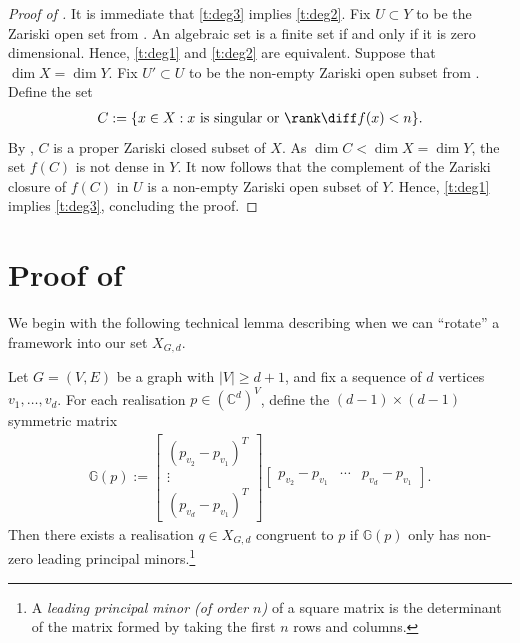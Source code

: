 \begin{proof}[Proof of ]
	It is immediate that \ref{t:deg3} implies \ref{t:deg2}.
	Fix $U \subset Y$ to be the Zariski open set from .
	An algebraic set is a finite set if and only if it is zero dimensional.
	Hence, \ref{t:deg1} and \ref{t:deg2} are equivalent.
	Suppose that $\dim X=\dim Y$.
	Fix $U' \subset U$ to be the non-empty Zariski open subset from .
	Define the set
	\begin{align*}
		C := \{x \in X : x \text{ is singular or } \rank \diff f(x) <n\}.
	\end{align*}
	By ,
	$C$ is a proper Zariski closed subset of $X$.
	As $\dim C < \dim X = \dim Y$,
	the set $f(C)$ is not dense in $Y$.
	It now follows that the complement of the Zariski closure of $f(C)$ in $U$ is a non-empty Zariski open subset of $Y$.
	Hence, \ref{t:deg1} implies \ref{t:deg3},
	concluding the proof.
\end{proof}







\section{Proof of \texorpdfstring{}{Lemma}}
\label{sec:xgd}

We begin with the following technical lemma describing when we can ``rotate'' a framework into our set $X_{G,d}$.

\begin{lemma}\label{l:rotate}
	Let $G=(V,E)$ be a graph with $|V| \geq d+1$,
	and fix a sequence of $d$ vertices $v_1,\ldots, v_d$.
	For each realisation $p \in (\mathbb{C}^d)^V$,
	define the $(d-1) \times (d-1)$ symmetric matrix
	\begin{align*}
		\mathbb{G}(p) := 		
		\begin{bmatrix}
			(p_{v_2} - p_{v_1})^T \\
			\vdots \\
			(p_{v_d} - p_{v_1})^T
		\end{bmatrix}
		\begin{bmatrix}
			p_{v_2} - p_{v_1} & \cdots & p_{v_d} - p_{v_1}
		\end{bmatrix}.
	\end{align*}
	Then there exists a realisation $q \in X_{G,d}$ congruent to $p$ if $\mathbb{G}(p)$ only has non-zero leading principal minors.\footnote{A \emph{leading principal minor (of order $n$)} of a square matrix is the determinant of the matrix formed by taking the first $n$ rows and columns.}
\end{lemma}

